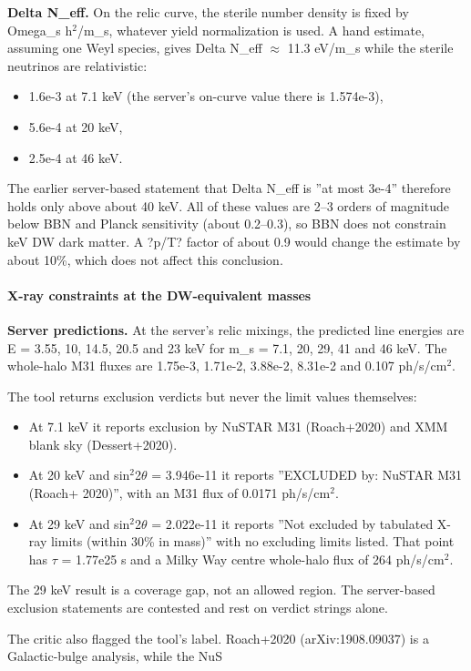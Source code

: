 \documentclass[11pt,a4paper]{article}
\begin{document}
\textbf{Delta N\_eff.} On the relic curve, the sterile number density is fixed by Omega\_s h$^2$/m\_s, whatever yield normalization is used. A hand estimate, assuming one Weyl species, gives Delta N\_eff $\approx$ 11.3 eV/m\_s while the sterile neutrinos are relativistic:

\begin{itemize}
  \item 1.6e-3 at 7.1 keV (the server's on-curve value there is 1.574e-3),
  \item 5.6e-4 at 20 keV,
  \item 2.5e-4 at 46 keV.
\end{itemize}
The earlier server-based statement that Delta N\_eff is ''at most 3e-4'' therefore holds only above about 40 keV. All of these values are 2--3 orders of magnitude below BBN and Planck sensitivity (about 0.2--0.3), so BBN does not constrain keV DW dark matter. A ?p/T? factor of about 0.9 would change the estimate by about 10\%, which does not affect this conclusion.

\paragraph{X-ray constraints at the DW-equivalent masses}
\textbf{Server predictions.} At the server's relic mixings, the predicted line energies are E = 3.55, 10, 14.5, 20.5 and 23 keV for m\_s = 7.1, 20, 29, 41 and 46 keV. The whole-halo M31 fluxes are 1.75e-3, 1.71e-2, 3.88e-2, 8.31e-2 and 0.107 ph/s/cm$^2$.

The tool returns exclusion verdicts but never the limit values themselves:

\begin{itemize}
  \item At 7.1 keV it reports exclusion by NuSTAR M31 (Roach+2020) and XMM blank sky (Dessert+2020).
  \item At 20 keV and sin$^2$2$\theta$ = 3.946e-11 it reports ''EXCLUDED by: NuSTAR M31 (Roach+ 2020)'', with an M31 flux of 0.0171 ph/s/cm$^2$.
  \item At 29 keV and sin$^2$2$\theta$ = 2.022e-11 it reports ''Not excluded by tabulated X-ray limits (within 30\% in mass)'' with no excluding limits listed. That point has $\tau$ = 1.77e25 s and a Milky Way centre whole-halo flux of 264 ph/s/cm$^2$.
\end{itemize}
The 29 keV result is a coverage gap, not an allowed region. The server-based exclusion statements are contested and rest on verdict strings alone.

The critic also flagged the tool's label. Roach+2020 (arXiv:1908.09037) is a Galactic-bulge analysis, while the NuS
\end{document}
